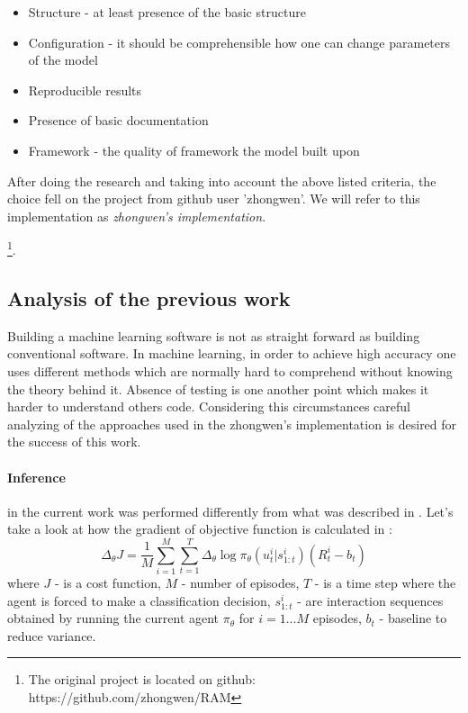 \begin{itemize}
	\item Structure - at least presence of the basic structure
	\item Configuration - it should be comprehensible how one can change parameters
		of the model
	\item Reproducible results
	\item Presence of basic documentation
	\item Framework - the quality of framework the model built upon
\end{itemize}

After doing the research and taking into account the above listed criteria,
the choice fell on the project from github user 'zhongwen'. We will refer to
this implementation as \emph{zhongwen's implementation}.

\footnote{The original project is located on github: https://github.com/zhongwen/RAM}.



\subsection{Analysis of the previous work}
Building a machine learning software is not as straight forward as building
conventional software. In machine learning, in order to achieve high accuracy
one uses different methods which are normally hard to comprehend without knowing
the theory behind it. Absence of testing is one another point which makes it
harder to understand others code. Considering this circumstances careful
analyzing of the approaches used in the zhongwen's implementation
is desired for the success of this work.

\paragraph{Inference} in the current work was performed differently from what was
described in \cite{Ba2015}.
Let's take a look at how the gradient of objective function is calculated in \cite{Ba2015}:
\begin{equation} \label{eq:}
	\Delta_{\theta} J = \frac{1}{M} \sum_{i=1}^M \sum_{t=1}^T
		\Delta_{\theta} \log \pi_{\theta}(u_t^i| s_{1:t}^i) (R_t^i - b_t)
\end{equation}
where $J$ - is a cost function, $M$ - number of episodes,
$T$ - is a time step where the agent is forced to make a classification decision,
$s_{1:t}^i$ - are interaction sequences obtained by
running the current agent $\pi_{\theta}$ for $i = 1 . . .M$ episodes,
$b_t$ - baseline to reduce variance.

